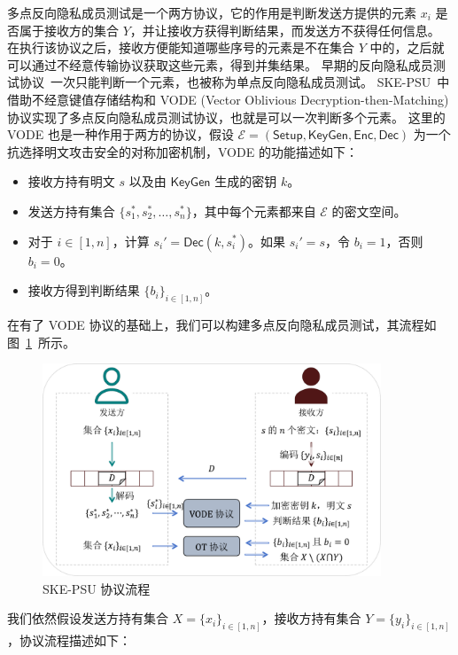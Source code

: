 多点反向隐私成员测试是一个两方协议，它的作用是判断发送方提供的元素 $x_i$ 是否属于接收方的集合 $Y$，并让接收方获得判断结果，而发送方不获得任何信息。
在执行该协议之后，接收方便能知道哪些序号的元素是不在集合 $Y$ 中的，之后就可以通过不经意传输协议获取这些元素，得到并集结果。
早期的反向隐私成员测试协议~\cite{kolesnikov2019scalable}一次只能判断一个元素，也被称为单点反向隐私成员测试。
SKE-PSU~\cite{zhang2023linear}中借助不经意键值存储结构和 VODE (Vector Oblivious Decryption-then-Matching) 协议实现了多点反向隐私成员测试协议，也就是可以一次判断多个元素。
这里的 VODE 也是一种作用于两方的协议，假设 $\mathcal{E} = (\mathsf{Setup}, \mathsf{KeyGen}, \mathsf{Enc}, \mathsf{Dec})$ 为一个抗选择明文攻击安全的对称加密机制，VODE 的功能描述如下：
\begin{itemize}
  \item 接收方持有明文 $s$ 以及由 $\mathsf{KeyGen}$ 生成的密钥 $k$。
  \item 发送方持有集合 $\{s_1^*, s_2^*, \dots, s_n^*\}$，其中每个元素都来自 $\mathcal{E}$ 的密文空间。
  \item 对于 $i\in [1,n]$，计算 $s_i' = \mathsf{Dec}(k, s_i^*)$。如果 $s_i' = s$，令 $b_i = 1$，否则 $b_i = 0$。
  \item 接收方得到判断结果 $\{b_i\}_{i\in [1,n]}$。
\end{itemize}
在有了 VODE 协议的基础上，我们可以构建多点反向隐私成员测试，其流程如图~\ref{fig:psu_okvs}~所示。
\begin{figure}[ht]
  \centering
  \includegraphics[width=0.9\textwidth]{figures/psu_okvs.pdf}
  \caption{SKE-PSU 协议流程}
  \label{fig:psu_okvs}
\end{figure}
我们依然假设发送方持有集合 $X = \{x_i\}_{i\in [1,n]}$，接收方持有集合 $Y = \{y_i\}_{i\in [1,n]}$，协议流程描述如下：
